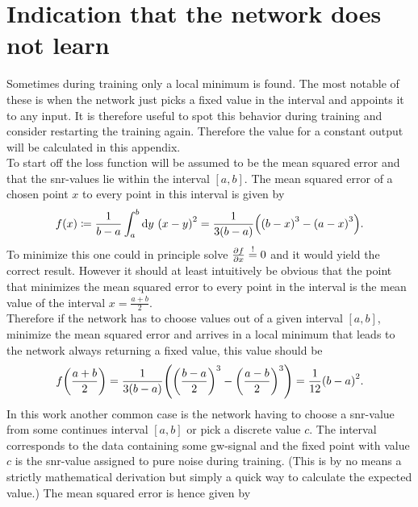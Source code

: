 \section{Indication that the network does not learn}\label{app:network_does_not_learn}
Sometimes during training only a local minimum is found. The most notable of these is when the network just picks a fixed value in the interval and appoints it to any input. It is therefore useful to spot this behavior during training and consider restarting the training again. Therefore the value for a constant output will be calculated in this appendix.
\medskip\\
To start off the loss function will be assumed to be the mean squared error and that the \gls{snr}-values lie within the interval $\left[a,b\right]$. The mean squared error of a chosen point $x$ to every point in this interval is given by
\begin{equation}
f(x)\coloneqq\frac{1}{b-a}\int_a^b\diff y\ \lr{x-y}^2=\frac{1}{3\lr{b-a}}\lr{\lr{b-x}^3-\lr{a-x}^3}.
\end{equation}
To minimize this one could in principle solve $\frac{\partial f}{\partial x}\overset{!}{=} 0$ and it would yield the correct result. However it should at least intuitively be obvious that the point that minimizes the mean squared error to every point in the interval is the mean value of the interval $x=\frac{a+b}{2}$.\\
Therefore if the network has to choose values out of a given interval $\left[a,b\right]$, minimize the mean squared error and arrives in a local minimum that leads to the network always returning a fixed value, this value should be
\begin{equation}
f{\left( \frac{a+b}{2} \right)}=\frac{1}{3{\left( b-a \right)}}{\left( {\left( \frac{b-a}{2} \right)}^3-{\left( \frac{a-b}{2} \right)}^3 \right)}=\frac{1}{12}{\left( b-a \right)}^2.
\end{equation}
In this work another common case is the network having to choose a \gls{snr}-value from some continues interval $\left[a,b\right]$ or pick a discrete value $c$. The interval corresponds to the data containing some \gls{gw}-signal and the fixed point with value $c$ is the \gls{snr}-value assigned to pure noise during training. (This is by no means a strictly mathematical derivation but simply a quick way to calculate the expected value.) The mean squared error is hence given by
